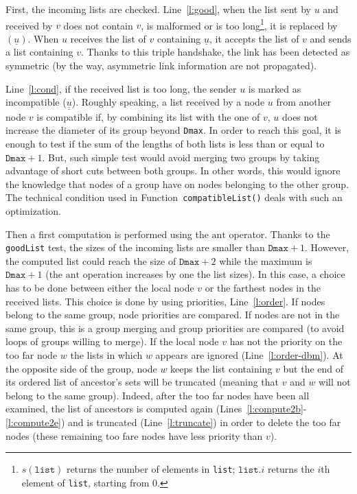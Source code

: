 \documentclass[11pt,english]{article}
\begin{document}
First, the incoming lists are checked.  Line~\ref{l:good}, when the list sent by
$u$ and received by $v$ does not contain $v$, is malformed or is too
long\footnote{$s(\texttt{list})$ returns the number of elements in
\texttt{list}; $\texttt{list}.i$ returns the $i$th element of \texttt{list},
starting from 0.}, it is replaced by $(\underline{u})$.  When $u$ receives the
list of $v$ containing $\underline{u}$, it accepts the list of $v$ and sends a
list containing $v$. Thanks to this triple handshake, the link has been detected
as symmetric (by the way, asymmetric link information are not propagated).

Line~\ref{l:cond}, if the received list is too long, the sender $u$ is marked as
incompatible ($\underline{\underline{u}}$).  Roughly speaking, a list received
by a node $u$ from another node $v$ is compatible if, by combining its list with
the one of $v$, $u$ does not increase the diameter of its group beyond
\texttt{Dmax}.
In order to reach this goal, it is enough to test if the sum of the lengths of
both lists is less than or equal to $\texttt{Dmax}+1$.  But, such simple test
would avoid merging two groups by taking advantage of short cuts between both
groups.  In other words, this would ignore the knowledge that nodes of a group
have on nodes belonging to the other group.  The technical condition used in
Function~\texttt{compatibleList()} deals with such an optimization.

Then a first computation is performed using the $\mathrm{ant}$ operator. Thanks
to the \texttt{goodList} test, the sizes of the incoming lists are smaller than
$\texttt{Dmax}+1$.  However, the computed list could reach the size of
$\texttt{Dmax} + 2$ while the maximum is $\texttt{Dmax} + 1$ (the $\mathrm{ant}$
operation increases by one the list sizes).
In this case, a choice has to be done between either the local node $v$ or the
farthest nodes in the received lists. This choice is done by using priorities,
Line~\ref{l:order}. If nodes belong to the same group, node priorities are
compared. If nodes are not in the same group, this is a group merging and group
priorities are compared (to avoid loops of groups willing to merge).
If the local node $v$ has not the priority on the too far node $w$
the lists in which $w$ appears are ignored (Line~\ref{l:order-dbm}).
At the opposite side of the group, node $w$ keeps the list containing $v$ but
the end of its ordered list of ancestor's sets will be truncated (meaning that
$v$ and $w$ will not belong to the same group).
Indeed, after the too far nodes have been all examined, the list of ancestors is
computed again (Lines~\ref{l:compute2b}-\ref{l:compute2e}) and is truncated
(Line~\ref{l:truncate}) in order to delete the too far nodes (these remaining
too fare nodes have less priority than $v$).
\end{document}
